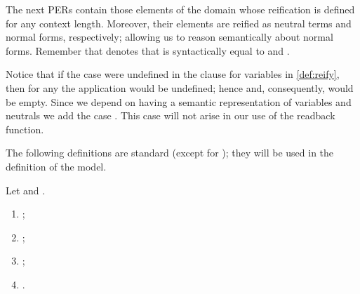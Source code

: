 \documentclass{LMCS}
\newcommand{\LONGVERSION}[1]{}
\newcommand{\SHORTVERSION}[1]{#1}
\begin{document}
The next PERs contain those elements of the domain  whose
reification is defined for any context length. Moreover, their
elements are reified as neutral terms and normal forms, respectively;
allowing us to reason semantically about normal forms. Remember that
 denotes that  is syntactically equal to  and .

\begin{defi}
\label{def:pernf}
  
\end{defi}\medskip

\noindent Notice that if the case  were undefined in the clause for
variables in \ref{def:reify}, then for any  the application
 would be undefined; hence  and, consequently,  would be empty. Since we depend on
having a semantic representation of variables and neutrals we add the
case . This case will not arise in our use of the readback
function.

\LONGVERSION{
\begin{rem}
  \label{rem:pers}
  These are clearly PERs over : symmetry is trivial and
  transitivity follows from transitivity of the syntactical equality.
\end{rem}

\begin{lem}[Closure properties of  and ]
\label{rem:presnf} \bla
  \begin{enumerate}[\em(1)]
  \item .
  \item Let . If  for all , then .
  \item If  and , then .
  \item If  for all , then .
  \item  for all .
  \item If  and , then . 
  \end{enumerate}
\end{lem}
}





\SHORTVERSION{
  The following definitions are standard
  \cite{aspinall:csl94,coquandPollackTakeyama:fundinf05} (except for
  ); they will be used in the definition of the model.  
\begin{defi} Let  and .
  \begin{enumerate}[\em(1)]
  \item ;
  \item ;
  \item ;
  \item .
  \end{enumerate}
\end{defi}
}
\end{document}
